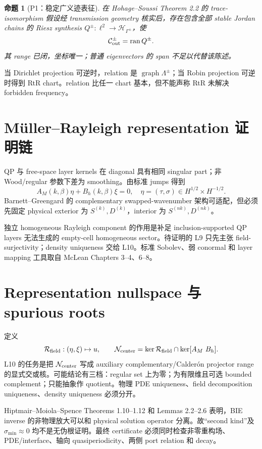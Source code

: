\documentclass[UTF8,11pt,fontset=none]{ctexart}
\newtheorem{proposition}[theorem]{命题}
\theoremstyle{definition}
\begin{document}
\begin{proposition}[P1：稳定广义迹表征]
在 Hohage--Soussi Theorem 2.2 的 trace-isomorphism 假设经 transmission geometry 核实后，存在包含全部 stable Jordan chains 的 Riesz synthesis $Q^\pm:\ell^2\to\mathcal H_{\Gamma^\pm}$，使
\[
 \mathcal C^\pm_{\rm out}=\operatorname{ran}Q^\pm.
\]
其 range 已闭，坐标唯一；普通 eigenvectors 的 span 不足以代替该陈述。
\end{proposition}

当 Dirichlet projection 可逆时，relation 是 $\operatorname{graph}\Lambda^\pm$；当 Robin projection 可逆时得到 RtR chart。relation 比任一 chart 基本，但不能声称 RtR 未解决 forbidden frequency。

\section{Müller--Rayleigh representation 证明链}

QP 与 free-space layer kernels 在 diagonal 具有相同 singular part；非 Wood/regular 参数下差为 smoothing。由标准 jumps 得到
\[
A_M(k,\beta)\eta+B_h(k,\beta)\xi=0,
\quad \eta=(\tau,\sigma)\in H^{1/2}\times H^{-1/2}.
\]
Barnett--Greengard 的 complementary swapped-wavenumber 架构可适配，但必须先固定 physical exterior 为 $S^{(k)},D^{(k)}$，interior 为 $S^{(nk)},D^{(nk)}$\cite{BarnettGreengard2010,ColtonKress1983}。

独立 homogeneous Rayleigh component 的作用是补足 inclusion-supported QP layers 无法生成的 empty-cell homogeneous sector。待证明的 L9 只先主张 field-surjectivity；density uniqueness 交给 L10。标准 Sobolev、弱 conormal 和 layer mapping 工具取自 McLean Chapters 3--4、6--8\cite{McLean2000}。

\section{Representation nullspace 与 spurious roots}

定义
\[
\mathcal R_{\rm field}:(\eta,\xi)\mapsto u,\qquad
\mathcal N_{\rm center}=\ker\mathcal R_{\rm field}\cap\ker[A_M\ B_h].
\]
L10 的任务是把 $\mathcal N_{\rm center}$ 写成 auxiliary complementary/Calderón projector range 的显式交或核。可能结论有三档：regular set 上为零；为有限维且可选 bounded complement；只能抽象作 quotient。物理 PDE uniqueness、field decomposition uniqueness、density uniqueness 必须分开。

Hiptmair--Moiola--Spence Theorems 1.10--1.12 和 Lemmas 2.2--2.6 表明，BIE inverse 的非物理放大可以和 physical solution operator 分离\cite{HiptmairMoiolaSpence2022}。故“second kind”及 $\sigma_{\min}\approx0$ 均不是无伪根证明。最终 certificate 必须同时检查非零重构场、PDE/interface、轴向 quasiperiodicity、两侧 port relation 和 decay。
\end{document}
